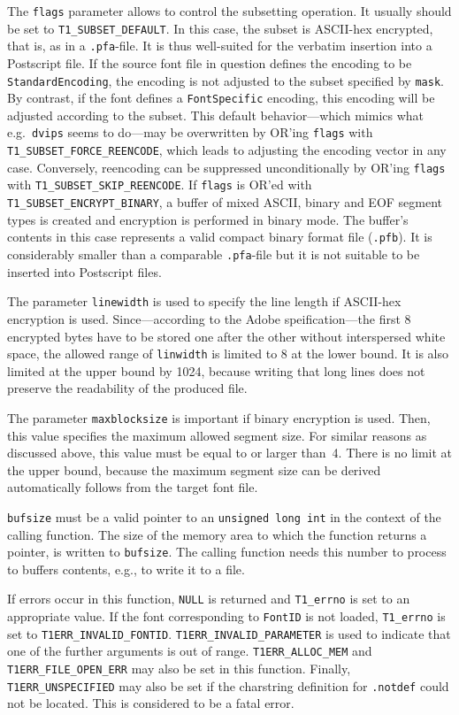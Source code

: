 The \verb+flags+ parameter allows to control the subsetting operation.  It
usually should be set to \verb+T1_SUBSET_DEFAULT+. In this case, the subset is
ASCII-hex encrypted, that is, as in a \verb+.pfa+-file. It is thus well-suited
for the verbatim insertion into a Postscript file. If the source font file in
question defines the encoding to be \verb+StandardEncoding+, the encoding is
not adjusted to the subset specified by \verb+mask+. By contrast, if the font
defines a \verb+FontSpecific+ encoding, this encoding will be adjusted
according to the subset. This default behavior---which mimics what
e.g.~\verb+dvips+ seems to do---may be overwritten by OR'ing \verb+flags+ with
\verb+T1_SUBSET_FORCE_REENCODE+, which leads to adjusting the encoding vector
in any case. Conversely, reencoding can be suppressed unconditionally by OR'ing
\verb+flags+ with \verb+T1_SUBSET_SKIP_REENCODE+. If \verb+flags+ is OR'ed
with \verb+T1_SUBSET_ENCRYPT_BINARY+, a buffer of mixed ASCII, binary and EOF
segment types is created and encryption is performed in binary mode. The
buffer's contents in this case represents a valid compact binary format file
(\verb+.pfb+). It is considerably smaller than a comparable \verb+.pfa+-file
but it is not suitable to be inserted into Postscript files.

The parameter \verb+linewidth+ is used to specify the line length if ASCII-hex
encryption is used. Since---according to the Adobe speification---the first 8
encrypted bytes have to be stored one after the other without interspersed
white space, the allowed range of \verb+linwidth+ is limited to 8 at the lower
bound. It is also limited at the upper bound by 1024, because writing that
long lines does not preserve the readability of the produced file.

The parameter \verb+maxblocksize+ is important if binary encryption is
used. Then, this value specifies the maximum allowed segment size. For similar
reasons as discussed above, this value must be equal to or larger
than~4. There is no limit at the upper bound, because the maximum segment size
can be derived automatically follows from the target font file.

\verb+bufsize+ must be a valid pointer to an \verb+unsigned long int+ in the
context of the calling function. The size of the memory area to which the
function returns a pointer, is written to \verb+bufsize+. The calling function
needs this number to process to buffers contents, e.g., to write it to a file. 

If errors occur in this function, \verb+NULL+ is returned and \verb+T1_errno+
is set to an appropriate value. If the font corresponding to \verb+FontID+ is
not loaded, \verb+T1_errno+ is set to \verb+T1ERR_INVALID_FONTID+.
\verb+T1ERR_INVALID_PARAMETER+ is used to indicate that one of the further
arguments is out of range. \verb+T1ERR_ALLOC_MEM+ and
\verb+T1ERR_FILE_OPEN_ERR+ may also be set in this function. Finally,
\verb+T1ERR_UNSPECIFIED+ may also be set if the charstring definition for
\verb+.notdef+ could not be located. This is considered to be a fatal error.

